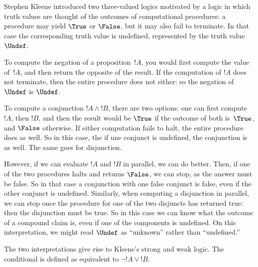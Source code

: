 \documentclass[../../../include/open-logic-section]{subfiles}
\begin{document}


Stephen Kleene introduced two three-valued logics motivated by a logic
in which truth values are thought of the outcomes of computational
procedures: a procedure may yield $\True$ or $\False$, but it may also
fail to terminate.  In that case the corresponding truth value is
undefined, represented by the truth value~$\Undef$.

To compute the negation of a proposition~$!A$, you would first compute
the value of~$!A$, and then return the opposite of the result.  If the
computation of $!A$ does not terminate, then the entire procedure does
not either: so the negation of $\Undef$ is $\Undef$.

To compute a conjunction $!A \land !B$, there are two options: one can
first compute~$!A$, then $!B$, and then the result would be $\True$ if
the outcome of both is~$\True$, and $\False$ otherwise.  If either
computation fails to halt, the entire procedure does as well. So in
this case, the if une conjunct is undefined, the conjunction is as
well.  The same goes for disjunction.

However, if we can evaluate $!A$ and $!B$ in parallel, we can do better.
Then, if one of the two procedures halts and returns $\False$, we can
stop, as the answer must be false.  So in that case a conjunction with
one false conjunct is false, even if the other conjunct is undefined.
Similarly, when computing a disjunction in parallel, we can stop once
the procedure for one of the two disjuncts has returned true: then the
disjunction must be true. So in this case we can know what the outcome
of a compound claim is, even if one of the components is undefined. On
this interpretation, we might read $\Undef$ as ``unknown'' rather than
``undefined.''

The two interpretations give rise to Kleene's strong and weak logic.
The conditional is defined as equivalent to $\lnot !A \lor !B$.
\end{document}
